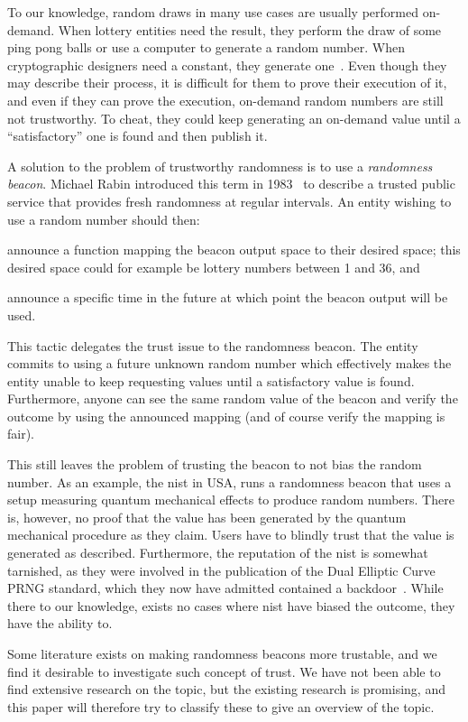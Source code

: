To our knowledge, random draws in many use cases are usually performed on-demand.
When lottery entities need the result, they perform the draw of some ping pong balls or use a computer to generate a random number. When cryptographic designers need a constant, they generate one~\cite{baigneres2015trap}.
Even though they may describe their process, it is difficult for them to prove their execution of it, and even if they can prove the execution, on-demand random numbers are still not trustworthy. To cheat, they could keep generating an on-demand value until a \enquote{satisfactory} one is found and then publish it.

A solution to the problem of trustworthy randomness is to use a \emph{randomness beacon}.
Michael Rabin introduced this term in 1983~\cite{rabin1983transaction} to describe a trusted public service that provides fresh randomness at regular intervals.
An entity wishing to use a random number should then:
\begin{eromanate*}
    \item announce a function mapping the beacon output space to their desired space; this desired space could for example be lottery numbers between 1 and 36, and
    \item announce a specific time in the future at which point the beacon output will be used.
\end{eromanate*}
This tactic delegates the trust issue to the randomness beacon.
The entity commits to using a future unknown random number which effectively makes the entity unable to keep requesting values until a satisfactory value is found.
Furthermore, anyone can see the same random value of the beacon and verify the outcome by using the announced mapping (and of course verify the mapping is fair).

This still leaves the problem of trusting the beacon to not bias the random number.
As an example, the \gls{nist} in USA, runs a randomness beacon that uses a setup measuring quantum mechanical effects to produce random numbers.
There is, however, no proof that the value has been generated by the quantum mechanical procedure as they claim.
Users have to blindly trust that the value is generated as described.
Furthermore, the reputation of the \gls{nist} is somewhat tarnished, as they were involved in the publication of the Dual Elliptic Curve PRNG standard, which they now have admitted contained a backdoor~\cite{nist2014backdoor}.
While there to our knowledge, exists no cases where \gls{nist} have biased the outcome, they have the ability to.

Some literature exists on making randomness beacons more trustable, and we find it desirable to investigate such concept of trust.
We have not been able to find extensive research on the topic, but the existing research is promising, and this paper will therefore try to classify these to give an overview of the topic.
